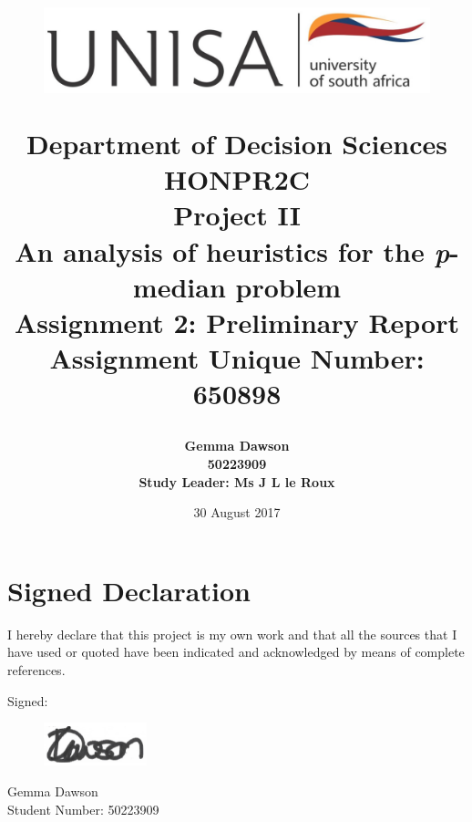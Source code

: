 \documentclass[11pt]{article}
\newcommand{\np}{\newpage}
\begin{document}
	\title{
		\begin{figure}[!htb]
			\begin{center}
				\includegraphics[width=12cm]{unisa.png}
			\end{center}
		\end{figure}
		Department of Decision Sciences\\[3mm]
		HONPR2C\\
		Project II \\[2cm]		
		{\Huge \textbf{An analysis of heuristics for the \emph{p}-median problem}}\\[15mm]
		Assignment 2: Preliminary Report\\[3mm]
		Assignment Unique Number: 650898\\[2cm]
	}
	\author{\textbf{\Large Gemma Dawson}\\[3mm]
		\textbf{\Large 50223909}\\[3mm]
		\textbf{Study Leader: Ms J L le Roux}
	}
	\date{\Large 30 August 2017}	
	\maketitle
	\thispagestyle{empty}
	\np
	
	\section*{Signed Declaration}
	I hereby declare that this project is my own work and that all the sources that I have used or quoted have been indicated and acknowledged by means of complete references.
	
	Signed:
	\begin{figure}[!htb]
			\includegraphics[width=3cm]{signature.png}
	\end{figure}

	Gemma Dawson\\
	Student Number: 50223909\\
	
	
	\thispagestyle{empty}
	\np
	
	\tableofcontents
	\thispagestyle{empty}
	\np
\end{document}
